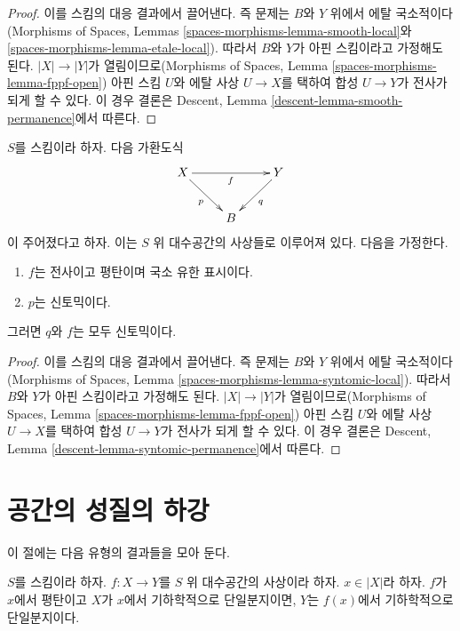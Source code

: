 \begin{proof}
이를 스킴의 대응 결과에서 끌어낸다. 즉 문제는 $B$와 $Y$ 위에서 에탈
국소적이다(Morphisms of Spaces, Lemmas
\ref{spaces-morphisms-lemma-smooth-local}와
\ref{spaces-morphisms-lemma-etale-local}). 따라서 $B$와 $Y$가 아핀
스킴이라고 가정해도 된다. $|X|\to|Y|$가 열림이므로(Morphisms of
Spaces, Lemma \ref{spaces-morphisms-lemma-fppf-open}) 아핀 스킴 $U$와
에탈 사상 $U\to X$를 택하여 합성 $U\to Y$가 전사가 되게 할 수 있다.
이 경우 결론은 Descent, Lemma
\ref{descent-lemma-smooth-permanence}에서 따른다.
\end{proof}

\begin{lemma}
\label{lemma-syntomic-permanence}
$S$를 스킴이라 하자. 다음 가환도식
$$
\xymatrix{
X \ar[rr]_f \ar[rd]_p & &
Y \ar[dl]^q \\
& B
}
$$
이 주어졌다고 하자. 이는 $S$ 위 대수공간의 사상들로 이루어져 있다.
다음을 가정한다.
\begin{enumerate}
\item $f$는 전사이고 평탄이며 국소 유한 표시이다.
\item $p$는 신토믹이다.
\end{enumerate}
그러면 $q$와 $f$는 모두 신토믹이다.
\end{lemma}

\begin{proof}
이를 스킴의 대응 결과에서 끌어낸다. 즉 문제는 $B$와 $Y$ 위에서 에탈
국소적이다(Morphisms of Spaces, Lemma
\ref{spaces-morphisms-lemma-syntomic-local}). 따라서 $B$와 $Y$가 아핀
스킴이라고 가정해도 된다. $|X|\to|Y|$가 열림이므로(Morphisms of
Spaces, Lemma \ref{spaces-morphisms-lemma-fppf-open}) 아핀 스킴 $U$와
에탈 사상 $U\to X$를 택하여 합성 $U\to Y$가 전사가 되게 할 수 있다.
이 경우 결론은 Descent, Lemma
\ref{descent-lemma-syntomic-permanence}에서 따른다.
\end{proof}

\section{공간의 성질의 하강}
\label{section-descending-properties-spaces}

\noindent
이 절에는 다음 유형의 결과들을 모아 둔다.

\begin{lemma}
\label{lemma-descend-unibranch}
$S$를 스킴이라 하자. $f:X\to Y$를 $S$ 위 대수공간의 사상이라 하자.
$x\in|X|$라 하자. $f$가 $x$에서 평탄이고 $X$가 $x$에서 기하학적으로
단일분지이면, $Y$는 $f(x)$에서 기하학적으로 단일분지이다.
\end{lemma}

